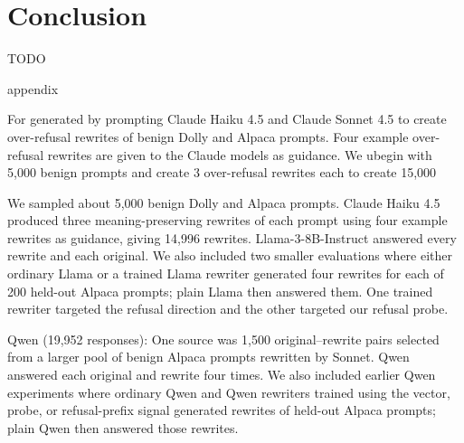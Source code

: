 \documentclass{article}
\begin{document}
\section{Conclusion}

TODO


appendix

For  generated by prompting Claude Haiku 4.5 and Claude Sonnet 4.5 to create over-refusal rewrites of benign Dolly and Alpaca prompts. Four example over-refusal rewrites are given to the Claude models as guidance. We ubegin with 5,000 benign prompts and create 3 over-refusal rewrites each to create 15,000


We sampled about 5,000 benign Dolly and Alpaca prompts. Claude Haiku 4.5 produced three meaning-preserving rewrites of each prompt using four example rewrites as guidance, giving 14,996 rewrites. Llama-3-8B-Instruct answered every rewrite and each original. We also included two smaller evaluations where either ordinary Llama or a trained Llama rewriter generated four rewrites for each of 200 held-out Alpaca prompts; plain Llama then answered them. One trained rewriter targeted the refusal direction and the other targeted our refusal probe.

Qwen (19,952 responses): One source was 1,500 original–rewrite pairs selected from a larger pool of benign Alpaca prompts rewritten by Sonnet. Qwen answered each original and rewrite four times. We also included earlier Qwen experiments where ordinary Qwen and Qwen rewriters trained using the vector, probe, or refusal-prefix signal generated rewrites of held-out Alpaca prompts; plain Qwen then answered those rewrites.



\end{document}
